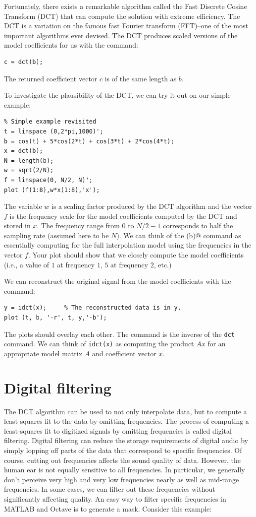 \documentclass[10pt]{article}
\begin{document}
Fortunately, there exists a remarkable algorithm called the Fast Discrete
Cosine Transform (DCT) that can compute the solution with extreme efficiency.
The DCT is a variation on the famous fast Fourier transform (FFT)--one of the
most important algorithms ever devised. The DCT produces scaled versions of the
model coefficients for us with the command:
\begin{verbatim}
c = dct(b);
\end{verbatim}
The returned coefficient vector $c$ is of the same length as $b$. 

To investigate the plausibility of the DCT, we can try it out on our
simple example:
\begin{verbatim}
% Simple example revisited
t = linspace (0,2*pi,1000)';
b = cos(t) + 5*cos(2*t) + cos(3*t) + 2*cos(4*t);
x = dct(b);
N = length(b);
w = sqrt(2/N);
f = linspace(0, N/2, N)';
plot (f(1:8),w*x(1:8),'x');
\end{verbatim}
The variable $w$ is a scaling factor produced by the DCT algorithm and
the vector $f$ is the frequency scale for the model coefficients 
computed by the DCT and stored in $x$.
The frequency range from $0$ to $N/2 - 1$ corresponds to half
the sampling rate (assumed here to be $N$).
We can think of the \verb@dct(b)@ command as essentially computing
\verb@A\b@ for the full interpolation model using the frequencies
in the vector $f$.
Your plot should show that we closely compute the model coefficients 
(i.e., a value of $1$ at frequency $1$, $5$ at frequency $2$, etc.)

We can reconstruct the original signal from the model coefficients with
the command:
\begin{verbatim}
y = idct(x);     % The reconstructed data is in y.
plot (t, b, '-r', t, y,'-b');
\end{verbatim}
The plots should overlay each other. The \verb@idct@ command is the inverse
of the {\tt dct} command. We can think of {\tt idct(x)} as 
computing the product $Ax$ for an appropriate model matrix $A$ and
coefficient vector $x$.




\section*{Digital filtering}

The DCT algorithm can be used to not only interpolate data, but to compute a
least-squares fit to the data by omitting frequencies.  The process of
computing a least-squares fit to digitized signals by omitting frequencies is
called digital filtering.  Digital filtering can reduce the storage
requirements of digital audio by simply lopping off parts of the data that
correspond to specific frequencies.  Of course, cutting out frequencies affects
the sound quality of data.  However, the human ear is not equally sensitive to
all frequencies.  In particular, we generally don't perceive very high and very
low frequencies nearly as well as mid-range frequencies.  In some cases, we can
filter out these frequencies without significantly affecting quality.  An easy
way to filter specific frequencies in MATLAB and Octave is to generate a mask.
Consider this example:
\end{document}

